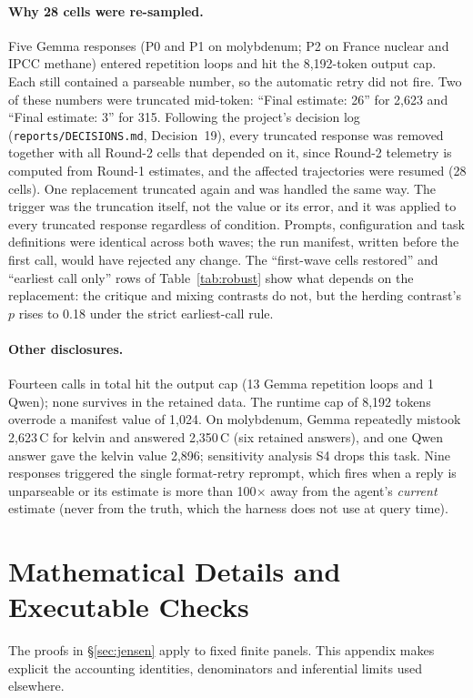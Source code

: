 \documentclass[10pt]{article}
\theoremstyle{manuscript}\newtheorem{proposition}{Proposition}
\begin{document}
\paragraph{Why 28 cells were re-sampled.} Five Gemma responses (P0 and P1 on molybdenum; P2 on France nuclear and IPCC methane) entered repetition loops and hit the 8,192-token output cap. Each still contained a parseable number, so the automatic retry did not fire. Two of these numbers were truncated mid-token: ``Final estimate: 26'' for 2,623 and ``Final estimate: 3'' for 315. Following the project's decision log (\texttt{reports/DECISIONS.md}, Decision~19), every truncated response was removed together with all Round-2 cells that depended on it, since Round-2 telemetry is computed from Round-1 estimates, and the affected trajectories were resumed (28 cells). One replacement truncated again and was handled the same way. The trigger was the truncation itself, not the value or its error, and it was applied to every truncated response regardless of condition. Prompts, configuration and task definitions were identical across both waves; the run manifest, written before the first call, would have rejected any change. The ``first-wave cells restored'' and ``earliest call only'' rows of Table~\ref{tab:robust} show what depends on the replacement: the critique and mixing contrasts do not, but the herding contrast's $p$ rises to 0.18 under the strict earliest-call rule.

\paragraph{Other disclosures.} Fourteen calls in total hit the output cap (13 Gemma repetition loops and 1 Qwen); none survives in the retained data. The runtime cap of 8,192 tokens overrode a manifest value of 1,024. On molybdenum, Gemma repeatedly mistook 2,623\,\textdegree C for kelvin and answered 2,350\,\textdegree C (six retained answers), and one Qwen answer gave the kelvin value 2,896; sensitivity analysis S4 drops this task. Nine responses triggered the single format-retry reprompt, which fires when a reply is unparseable or its estimate is more than 100$\times$ away from the agent's \emph{current} estimate (never from the truth, which the harness does not use at query time).

\FloatBarrier
\section{Mathematical Details and Executable Checks}\label{app:math}
The proofs in \S\ref{sec:jensen} apply to fixed finite panels. This appendix makes explicit the accounting identities, denominators and inferential limits used elsewhere.
\end{document}
